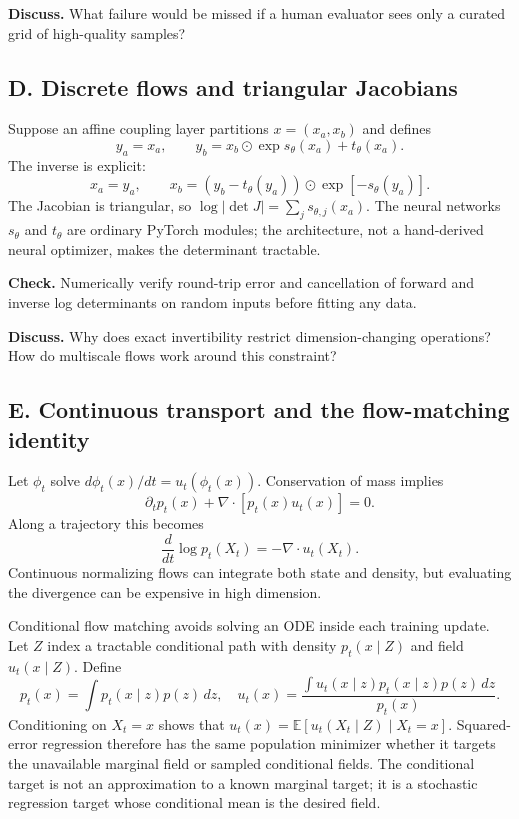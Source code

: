 \documentclass[11pt]{article}
\newcommand{\E}{\mathbb{E}}
\begin{document}
\textbf{Discuss.} What failure would be missed if a human evaluator sees only a
curated grid of high-quality samples?

\subsection*{D. Discrete flows and triangular Jacobians}

Suppose an affine coupling layer partitions $x=(x_a,x_b)$ and defines
\[
 y_a=x_a,\qquad y_b=x_b\odot\exp s_\theta(x_a)+t_\theta(x_a).
\]
The inverse is explicit:
\[
 x_a=y_a,\qquad
 x_b=(y_b-t_\theta(y_a))\odot\exp[-s_\theta(y_a)].
\]
The Jacobian is triangular, so
$\log|\det J|=\sum_j s_{\theta,j}(x_a)$. The neural networks $s_\theta$ and
$t_\theta$ are ordinary PyTorch modules; the architecture, not a hand-derived
neural optimizer, makes the determinant tractable.

\textbf{Check.} Numerically verify round-trip error and cancellation of forward
and inverse log determinants on random inputs before fitting any data.

\textbf{Discuss.} Why does exact invertibility restrict dimension-changing
operations? How do multiscale flows work around this constraint?

\subsection*{E. Continuous transport and the flow-matching identity}

Let $\phi_t$ solve $d\phi_t(x)/dt=u_t(\phi_t(x))$. Conservation of mass implies
\[
 \partial_t p_t(x)+\nabla\cdot[p_t(x)u_t(x)]=0.
\]
Along a trajectory this becomes
\[
 \frac{d}{dt}\log p_t(X_t)=-\nabla\cdot u_t(X_t).
\]
Continuous normalizing flows can integrate both state and density, but evaluating
the divergence can be expensive in high dimension.

Conditional flow matching avoids solving an ODE inside each training update.
Let $Z$ index a tractable conditional path with density $p_t(x\mid Z)$ and field
$u_t(x\mid Z)$. Define
\[
 p_t(x)=\int p_t(x\mid z)p(z)\,dz,
 \quad
 u_t(x)=\frac{\int u_t(x\mid z)p_t(x\mid z)p(z)\,dz}{p_t(x)}.
\]
Conditioning on $X_t=x$ shows that
$u_t(x)=\E[u_t(X_t\mid Z)\mid X_t=x]$. Squared-error regression therefore has
the same population minimizer whether it targets the unavailable marginal field
or sampled conditional fields. The conditional target is not an approximation
to a known marginal target; it is a stochastic regression target whose
conditional mean is the desired field.
\end{document}
